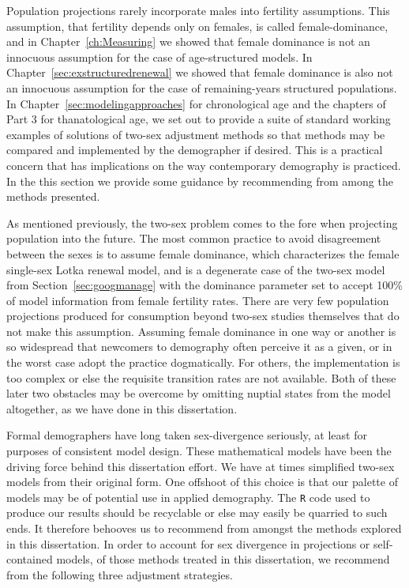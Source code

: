 
Population projections rarely incorporate males into fertility assumptions. This
assumption, that fertility depends only on females, is called female-dominance,
and in Chapter~\ref{ch:Measuring} we showed that female dominance is not an
innocuous assumption for the case of age-structured models. In
Chapter~\ref{sec:exstructuredrenewal} we showed that female dominance is also
not an innocuous assumption for the case of remaining-years structured
populations. In Chapter~\ref{sec:modelingapproaches} for chronological age and
the chapters of Part 3 for thanatological age, we set out to provide a suite of
standard working examples of solutions of two-sex adjustment methods so that 
methods may be compared and implemented by the demographer if desired. This 
is a practical concern that has implications on the way
contemporary demography is practiced. In the this section we provide some
guidance by recommending from among the methods presented.

As mentioned previously, the two-sex problem comes to the fore when projecting
population into the future. The most common practice to avoid disagreement between the sexes is to
assume female dominance, which characterizes the female single-sex Lotka
renewal model, and is a degenerate case of the
\citet{goodman1967age} two-sex model from Section~\ref{sec:googmanage} with the 
dominance parameter set to accept 100\% of model information from female
fertility rates. There are very few population projections produced for 
consumption beyond two-sex studies themselves that do not make this assumption. 
Assuming female dominance in one way or another is so widespread that newcomers
to demography often perceive it as a given, or in the worst case adopt the
practice dogmatically. For others, the implementation is too complex or
else the requisite transition rates are not available. Both of these later
two obstacles may be overcome by omitting nuptial states from the model
altogether, as we have done in this dissertation. 

Formal demographers have long taken sex-divergence seriously, at
least for purposes of consistent model design. These mathematical models
have been the driving force behind this dissertation effort. We have at
times simplified two-sex models from their original form. One offshoot of
this choice is that our palette of models may be of potential use in applied
demography. The \texttt{R} code used to produce our results should be recyclable 
or else may easily be quarried to such ends. It therefore behooves us to recommend from
amongst the methods explored in this dissertation. In order to account for sex
divergence in projections or self-contained models, of those methods treated in this dissertation, 
we recommend from the following three adjustment strategies.

